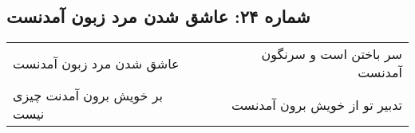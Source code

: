 \begin{center}
\section*{شماره ۲۴: عاشق شدن مرد زبون آمدنست}
\label{sec:024}
\begin{longtable}{l p{0.5cm} r}
عاشق شدن مرد زبون آمدنست
&&
سر باختن است و سرنگون آمدنست
\\
بر خویش برون آمدنت چیزی نیست
&&
تدبیر تو از خویش برون آمدنست
\\
\end{longtable}
\end{center}
